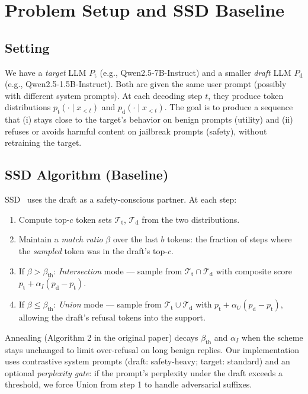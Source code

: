 \documentclass[11pt,a4paper]{article}
\begin{document}
\section{Problem Setup and SSD Baseline}
\label{sec:prelim}

\subsection{Setting}
We have a \emph{target} LLM $P_{\mathrm{t}}$ (e.g., Qwen2.5-7B-Instruct) and a smaller \emph{draft} LLM $P_{\mathrm{d}}$ (e.g., Qwen2.5-1.5B-Instruct). Both are given the same user prompt (possibly with different system prompts). At each decoding step $t$, they produce token distributions $p_{\mathrm{t}}(\cdot\mid x_{<t})$ and $p_{\mathrm{d}}(\cdot\mid x_{<t})$. The goal is to produce a sequence that (i) stays close to the target's behavior on benign prompts (utility) and (ii) refuses or avoids harmful content on jailbreak prompts (safety), without retraining the target.

\subsection{SSD Algorithm (Baseline)}
\label{sec:ssd}

SSD~\cite{ssd2025} uses the draft as a safety-conscious partner. At each step:
\begin{enumerate}
  \item Compute top-$c$ token sets $\mathcal{T}_{\mathrm{t}}$, $\mathcal{T}_{\mathrm{d}}$ from the two distributions.
  \item Maintain a \emph{match ratio} $\beta$ over the last $b$ tokens: the fraction of steps where the \emph{sampled} token was in the draft's top-$c$.
  \item If $\beta > \beta_{\mathrm{th}}$: \emph{Intersection} mode — sample from $\mathcal{T}_{\mathrm{t}} \cap \mathcal{T}_{\mathrm{d}}$ with composite score $p_{\mathrm{t}} + \alpha_I (p_{\mathrm{d}} - p_{\mathrm{t}})$.
  \item If $\beta \le \beta_{\mathrm{th}}$: \emph{Union} mode — sample from $\mathcal{T}_{\mathrm{t}} \cup \mathcal{T}_{\mathrm{d}}$ with $p_{\mathrm{t}} + \alpha_U (p_{\mathrm{d}} - p_{\mathrm{t}})$, allowing the draft's refusal tokens into the support.
\end{enumerate}
Annealing (Algorithm 2 in the original paper) decays $\beta_{\mathrm{th}}$ and $\alpha_I$ when the scheme stays unchanged to limit over-refusal on long benign replies. Our implementation uses contrastive system prompts (draft: safety-heavy; target: standard) and an optional \emph{perplexity gate}: if the prompt's perplexity under the draft exceeds a threshold, we force Union from step 1 to handle adversarial suffixes.
\end{document}
